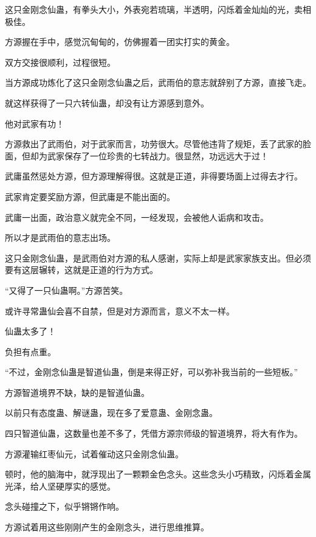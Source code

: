 
\begin{this_body}



这只金刚念仙蛊，有拳头大小，外表宛若琉璃，半透明，闪烁着金灿灿的光，卖相极佳。

方源握在手中，感觉沉甸甸的，仿佛握着一团实打实的黄金。

双方交接很顺利，过程很短。

当方源成功炼化了这只金刚念仙蛊之后，武雨伯的意志就辞别了方源，直接飞走。

就这样获得了一只六转仙蛊，却没有让方源感到意外。

他对武家有功！

方源救出了武雨伯，对于武家而言，功劳很大。尽管他违背了规矩，丢了武家的脸面，但却为武家保存了一位珍贵的七转战力。很显然，功远远大于过！

武庸虽然惩处方源，但方源理解得很。这就是正道，非得要场面上过得去才行。

武家肯定要奖励方源，但武庸是不能出面的。

武庸一出面，政治意义就完全不同，一经发现，会被他人诟病和攻击。

所以才是武雨伯的意志出场。

这只金刚念仙蛊，是武雨伯对方源的私人感谢，实际上却是武家家族支出。但必须要有这层辗转，这就是正道的行为方式。

“又得了一只仙蛊啊。”方源苦笑。

或许寻常蛊仙会喜不自禁，但是对方源而言，意义不太一样。

仙蛊太多了！

负担有点重。

“不过，金刚念仙蛊是智道仙蛊，倒是来得正好，可以弥补我当前的一些短板。”

方源智道境界不缺，缺的是智道仙蛊。

以前只有态度蛊、解谜蛊，现在多了爱意蛊、金刚念蛊。

四只智道仙蛊，这数量也差不多了，凭借方源宗师级的智道境界，将大有作为。

方源灌输红枣仙元，试着催动这只金刚念仙蛊。

顿时，他的脑海中，就浮现出了一颗颗金色念头。这些念头小巧精致，闪烁着金属光泽，给人坚硬厚实的感觉。

念头碰撞之下，似乎锵锵作响。

方源试着用这些刚刚产生的金刚念头，进行思维推算。


\end{this_body}
